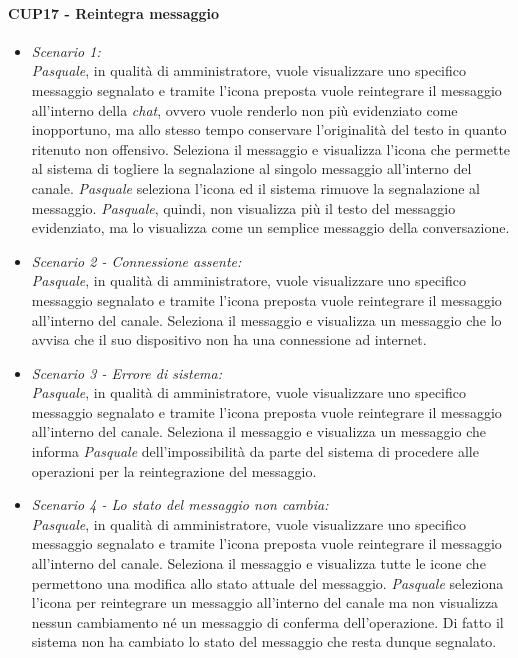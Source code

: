 \paragraph{CUP17 - Reintegra messaggio\\}
\begin{itemize}
	\item \textit{Scenario 1:\\}
	\textit{Pasquale}, in qualità di amministratore, vuole visualizzare uno specifico messaggio segnalato e tramite l’icona preposta vuole reintegrare il messaggio all’interno della \textit{chat}, ovvero vuole renderlo non più evidenziato come inopportuno, ma allo stesso tempo conservare l’originalità del testo in quanto ritenuto non offensivo. Seleziona il messaggio e visualizza l’icona che permette al sistema di togliere la segnalazione al singolo messaggio all’interno del canale. \textit{Pasquale} seleziona l’icona ed il sistema rimuove la segnalazione al messaggio. \textit{Pasquale}, quindi, non visualizza più il testo del messaggio evidenziato, ma lo visualizza come un semplice messaggio della conversazione.\\
	
	\item \textit{Scenario 2 - Connessione assente:\\}
	\textit{Pasquale}, in qualità di amministratore, vuole visualizzare uno specifico messaggio segnalato e tramite l’icona preposta vuole reintegrare il  messaggio all’interno del canale. Seleziona il messaggio e visualizza un messaggio che lo avvisa che il suo dispositivo non ha una connessione ad internet.\\
	
	\item \textit{Scenario 3 - Errore di sistema:\\}
	\textit{Pasquale}, in qualità di amministratore, vuole visualizzare uno specifico messaggio segnalato e tramite l’icona preposta vuole reintegrare il  messaggio all’interno del canale. Seleziona il messaggio e visualizza un messaggio che informa \textit{Pasquale} dell’impossibilità da parte del sistema di procedere alle operazioni per la reintegrazione del messaggio.\\
	
	\item \textit{Scenario 4 - Lo stato del messaggio non cambia:\\}
	\textit{Pasquale}, in qualità di amministratore, vuole visualizzare uno specifico messaggio segnalato e tramite l’icona preposta vuole reintegrare il  messaggio all’interno del canale. 
	Seleziona il messaggio e visualizza tutte le icone che permettono una modifica allo stato attuale del messaggio. \textit{Pasquale} seleziona l’icona per reintegrare un messaggio all’interno del canale ma non visualizza nessun cambiamento né un messaggio di conferma dell’operazione. Di fatto il sistema non ha cambiato lo stato del messaggio che resta dunque segnalato.\\
\end{itemize}

